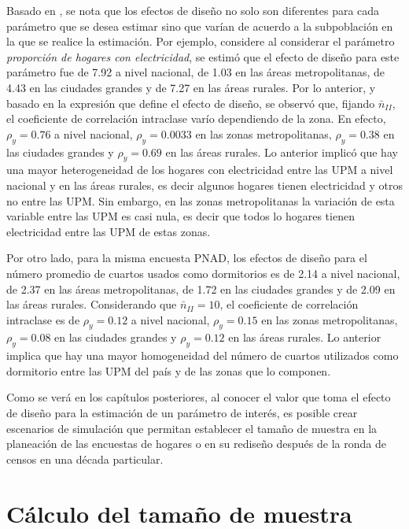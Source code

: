 \documentclass[
  12pt,
]{book}
\begin{document}
Basado en \citet[capítulo 7]{United_Nations_2005}, se nota que los efectos de diseño no solo son diferentes para cada parámetro que se desea estimar sino que varían de acuerdo a la subpoblación en la que se realice la estimación. Por ejemplo, considere al considerar el parámetro \emph{proporción de hogares con electricidad}, se estimó que el efecto de diseño para este parámetro fue de 7.92 a nivel nacional, de 1.03 en las áreas metropolitanas, de 4.43 en las ciudades grandes y de 7.27 en las áreas rurales. Por lo anterior, y basado en la expresión que define el efecto de diseño, se observó que, fijando \(\bar{n}_{II}\), el coeficiente de correlación intraclase varío dependiendo de la zona. En efecto, \(\rho_y= 0.76\) a nivel nacional, \(\rho_y= 0.0033\) en las zonas metropolitanas, \(\rho_y= 0.38\) en las ciudades grandes y \(\rho_y= 0.69\) en las áreas rurales. Lo anterior implicó que hay una mayor heterogeneidad de los hogares con electricidad entre las UPM a nivel nacional y en las áreas rurales, es decir algunos hogares tienen electricidad y otros no entre las UPM. Sin embargo, en las zonas metropolitanas la variación de esta variable entre las UPM es casi nula, es decir que todos lo hogares tienen electricidad entre las UPM de estas zonas.

Por otro lado, para la misma encuesta PNAD, los efectos de diseño para el número promedio de cuartos usados como dormitorios es de 2.14 a nivel nacional, de 2.37 en las áreas metropolitanas, de 1.72 en las ciudades grandes y de 2.09 en las áreas rurales. Considerando que \(\bar{n}_{II}=10\), el coeficiente de correlación intraclase es de \(\rho_y= 0.12\) a nivel nacional, \(\rho_y= 0.15\) en las zonas metropolitanas, \(\rho_y= 0.08\) en las ciudades grandes y \(\rho_y= 0.12\) en las áreas rurales. Lo anterior implica que hay una mayor homogeneidad del número de cuartos utilizados como dormitorio entre las UPM del país y de las zonas que lo componen.

Como se verá en los capítulos posteriores, al conocer el valor que toma el efecto de diseño para la estimación de un parámetro de interés, es posible crear escenarios de simulación que permitan establecer el tamaño de muestra en la planeación de las encuestas de hogares o en su rediseño después de la ronda de censos en una década particular.

\hypertarget{cuxe1lculo-del-tamauxf1o-de-muestra}{%
\chapter{Cálculo del tamaño de muestra}\label{cuxe1lculo-del-tamauxf1o-de-muestra}}
\end{document}
